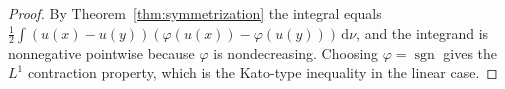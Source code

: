 \begin{proof}
\leanok
By Theorem~\ref{thm:symmetrization} the integral equals $\frac12 \int (u(x) - u(y))(\varphi(u(x)) - \varphi(u(y)))\, \mathrm{d}\nu$, and the integrand is nonnegative pointwise because $\varphi$ is nondecreasing. Choosing $\varphi = \operatorname{sgn}$ gives the $L^1$ contraction property, which is the Kato-type inequality in the linear case.
\end{proof}
